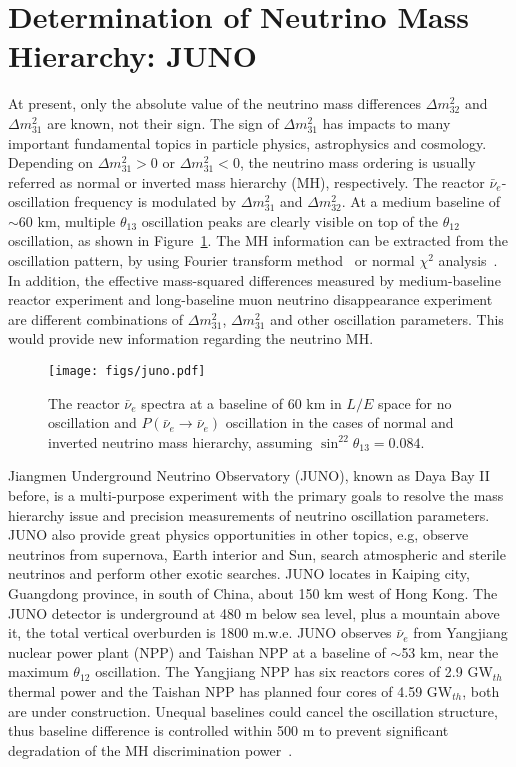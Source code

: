 \newcommand{\fixit}[1]{{\color{red}FIXIT: #1}}
\section{Determination of Neutrino Mass Hierarchy: JUNO}

At present, only the absolute value of the neutrino mass differences $\Delta m^2_{32}$ and $\Delta m^2_{31}$ are known, not their sign. The sign of $\Delta m^2_{31}$ has impacts to many important fundamental topics in particle physics, astrophysics and cosmology. Depending on $\Delta m^2_{31}>0$ or $\Delta m^2_{31}<0$, the neutrino mass ordering is usually referred as normal or inverted mass hierarchy (MH), respectively. The reactor $\bar\nu_e$-oscillation frequency is modulated by $\Delta m^2_{31}$ and $\Delta m^2_{32}$. At a medium baseline of $\sim$60 km, multiple $\theta_{13}$ oscillation peaks are clearly visible on top of the $\theta_{12}$ oscillation, as shown in Figure~\ref{fig:juno}. The MH information can be extracted from the oscillation pattern, by using Fourier transform method~\cite{Zhan-PRD08,Zhan-PRD09} or normal $\chi^2$ analysis~\cite{Li-PRD13}. In addition, the effective mass-squared differences measured by medium-baseline reactor experiment and long-baseline muon neutrino disappearance experiment are different combinations of $\Delta m^2_{31}$, $\Delta m^2_{31}$ and other oscillation parameters. This would provide new information regarding the neutrino MH.

\begin{figure}[!htb] \label{fig:juno}
  \centering
  \texttt{[image: figs/juno.pdf]}
  \caption{The reactor $\bar\nu_e$ spectra at a baseline of 60 km in $L/E$ space for no oscillation and $P(\bar\nu_e\to\bar\nu_e)$ oscillation in the cases of normal and inverted neutrino mass hierarchy, assuming $\sin^22\theta_{13}=0.084$.}
\end{figure}

Jiangmen Underground Neutrino Observatory (JUNO), known as Daya
Bay II before, is a multi-purpose experiment with the primary goals to resolve the mass hierarchy issue and precision measurements of neutrino oscillation parameters. JUNO also provide great physics opportunities
in other topics, e.g, observe neutrinos from supernova, Earth interior and Sun, search atmospheric and sterile neutrinos and perform other exotic searches. JUNO locates in Kaiping city, Guangdong province, in south of China, about 150 km west of Hong Kong. The JUNO detector is underground at 480 m below sea level, plus a mountain above it, the total vertical overburden is 1800 m.w.e. JUNO observes $\bar\nu_e$ from Yangjiang nuclear power plant (NPP) and Taishan NPP at a baseline of $\sim$53 km, near the maximum $\theta_{12}$ oscillation. The Yangjiang NPP has six reactors cores of 2.9 GW$_{th}$ thermal power and the Taishan NPP has planned four cores of 4.59 GW$_{th}$, both are under construction. Unequal baselines could cancel the oscillation structure, thus baseline difference is controlled within 500 m to prevent significant degradation of the MH discrimination power~\cite{Li-PRD13}.

